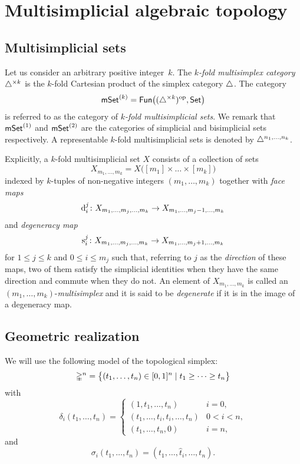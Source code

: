 
\section{Multisimplicial algebraic topology}\label{s:multisimplicial}

\subsection{Multisimplicial sets}\label{ss:multisimplicial sets}

Let us consider an arbitrary positive integer~$k$.
The \textit{$k$-fold multisimplex category} $\triangle^{\times k}$ is the $k$-fold Cartesian product of the simplex category $\triangle$.
The category
\[
\mathsf{mSet}^{(k)} = \mathsf{Fun}\big((\triangle^{\times k})^{\mathrm{op}}, \mathsf{Set}\big)
\]
is referred to as the category of \textit{$k$-fold multisimplicial sets}.
We remark that $\mathsf{mSet}^{(1)}$ and $\mathsf{mSet}^{(2)}$ are the categories of simplicial and bisimplicial sets respectively.
A representable $k$-fold multisimplicial sets is denoted by $\triangle^{n_1,\dots,n_k}$.

Explicitly, a $k$-fold multisimplicial set $X$ consists of a collection of sets
\[
X_{m_1,\dots,m_k} = X \big( [m_1] \times\dots\times [m_k] \big)
\]
indexed by $k$-tuples of non-negative integers $(m_1,\dots,m_k)$ together with \textit{face maps}
\[
\operatorname{d}_i^j \colon X_{m_1, \dots, m_j,\dots,m_k} \to X_{m_1, \dots, m_j-1, \dots, m_k}
\]
and \textit{degeneracy map}
\[
\operatorname{s}^j_i \colon X_{m_1, \dots, m_j,\dots,m_k} \to X_{m_1, \dots, m_j+1, \dots, m_k}
\]
for $1 \leq j \leq k$ and $0 \leq i \leq m_j$ such that, referring to $j$ as the \textit{direction} of these maps, two of them satisfy the simplicial identities when they have the same direction and commute when they do not.
An element of $X_{m_1,\dots,m_k}$ is called an $(m_1,\dots,m_k)$-\textit{multisimplex} and it is said to be \textit{degenerate} if it is in the image of a degeneracy map.

\subsection{Geometric realization}\label{ss:geometric realization}

We will use the following model of the topological simplex:
\[
\mathbb{\Delta}^n = \big\{
(t_1, \dots, t_n) \in [0,1]^n \mid t_1 \geq \dots \geq t_n
\big\}
\]
with
\[
\delta_i(t_1, \dots, t_n) =
\begin{cases}
	(1, t_1, \dots, t_n) & i = 0, \\
	(t_1, \dots, t_i, t_i, \dots, t_n) & 0 < i < n, \\
	(t_1, \dots, t_n, 0) & i = n,
\end{cases}
\]
and
\[
\sigma_i(t_1, \dots, t_n) = (t_1, \dots, \widehat t_i, \dots, t_n).
\]

